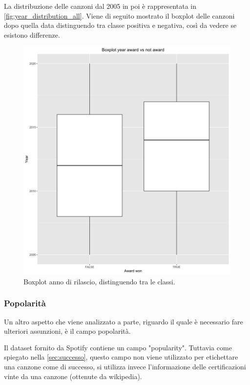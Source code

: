 La distribuzione delle canzoni dal 2005 in poi è rappresentata in
\autoref{fig:year_distribution_all}. Viene di seguito mostrato il
boxplot delle canzoni dopo quella data distinguendo tra classe
positiva e negativa, così da vedere se esistono differenze.

 \begin{figure}[H]
 	\centering
 	\includegraphics[width=13cm]{../images/year_award_comparison.png}
 	\caption{Boxplot anno di rilascio, distinguendo tra le classi.}
 	\label{fig:year_boxplot_award}
 \end{figure}
 
\subsubsection{Popolarità}
\label{sec:popularity}
Un altro aspetto che viene analizzato a parte, riguardo il quale è
necessario fare ulteriori assunzioni, è il campo popolarità.

Il dataset fornito da Spotify contiene un campo "popularity". Tuttavia
come spiegato nella \autoref{sec:successo}, questo campo non viene
utilizzato per etichettare una canzone come di successo, si utilizza
invece l'informazione delle certificazioni vinte da una canzone
(ottenute da wikipedia).

